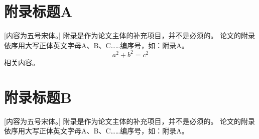 \chapter{附录标题A}
[内容为五号宋体。] 附录是作为论文主体的补充项目，并不是必须的。
论文的附录依序用大写正体英文字母A、B、C……编序号，如：附录A。
\begin{equation}
    a^2+b^2=c^2
\end{equation}
相关内容。
\chapter{附录标题B}
[内容为五号宋体。] 附录是作为论文主体的补充项目，并不是必须的。
论文的附录依序用大写正体英文字母A、B、C……编序号，如：附录A。